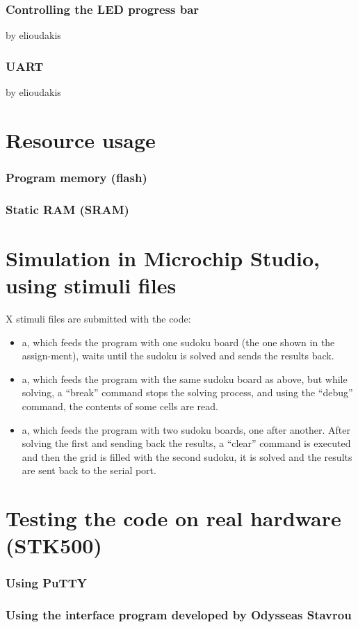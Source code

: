 \documentclass[12pt, a4]{article}
\begin{document}
\subsubsection*{Controlling the LED progress bar}
by elioudakis

\subsubsection*{UART}
by elioudakis

\section*{Resource usage}
\subsubsection*{Program memory (flash)}

\subsubsection*{Static RAM (SRAM)}

\section*{Simulation in Microchip Studio, using stimuli files}
X stimuli files are submitted with the code:
\begin{itemize}
\item	a, which feeds the program with one sudoku board (the one shown in the assign-ment), waits until the sudoku is solved and sends the results back.
\item	a, which feeds the program with the same sudoku board as above, but while solving, a “break” command stops the solving process, and using the “debug” command, the contents of some cells are read.
\item	a, which feeds the program with two sudoku boards, one after another. After solving the first and sending back the results, a “clear” command is executed and then the grid is filled with the second sudoku, it is solved and the results are sent back to the serial port.
\end{itemize}

\section*{Testing the code on real hardware (STK500)}
\subsubsection*{Using PuTTY}
\subsubsection*{Using the interface program developed by Odysseas Stavrou}
\end{document}
